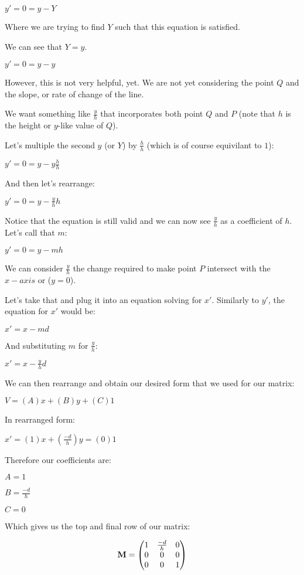 \documentclass[12pt]{article}
\begin{document}
$y' = 0 = y - Y$

Where we are trying to find $Y$ such that this equation is satisfied.

We can see that $Y = y$.

$y' = 0 = y - y$

However, this is not very helpful, yet.
We are not yet considering the point $Q$ and the slope, 
or rate of change of the line.

We want something like ${\frac{y}{h}}$ that incorporates both point $Q$ and $P$
(note that $h$ is the height or $y$-like value of $Q$).

Let's multiple the second $y$ (or $Y$) by ${\frac{h}{h}}$ (which is of course equivilant to $1$):

$y' = 0 = y - y {\frac{h}{h}}$

And then let's rearrange:

$y' = 0 = y - {\frac{y}{h}} h$

Notice that the equation is still valid and we can now see ${\frac{y}{h}}$ as a coefficient of $h$.
Let's call that $m$:

$y' = 0 = y - m h$

We can consider ${\frac{y}{h}}$ the change required to make 
point $P$ intersect with the $x-axis$ or ($y = 0$).

Let's take that and plug it into an equation solving for $x'$.
Similarly to $y'$, the equation for $x'$ would be:

$x' = x - m d$

And substituting $m$ for ${\frac{y}{h}}$:

$x' = x - {\frac{y}{h}} d$

We can then rearrange and obtain our desired form that we used for our matrix:

$V = (A)x + (B)y + (C)1$

In rearranged form:

$x' = (1)x + ({\frac{-d}{h}})y = (0)1$

Therefore our coefficients are:

$A = 1$

$B = {\frac{-d}{h}}$

$C = 0$

Which gives us the top and final row of our matrix:

\begin{align}
\textbf{M} &=
\begin{pmatrix}
1 & {\frac{-d}{h}} & 0 \\
0 & 0 & 0 \hfill \\
0 & 0 & 1 \hfill 
\end{pmatrix} \nonumber \\
\end{align}
\end{document}
